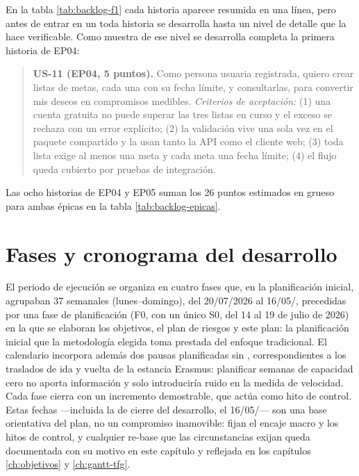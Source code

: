 En la tabla \ref{tab:backlog-f1} cada historia aparece resumida en una línea, pero antes de entrar en un  toda historia se desarrolla hasta un nivel de detalle que la hace verificable.
Como muestra de ese nivel se desarrolla completa la primera historia de EP04:

\begin{quote}
  \textbf{US-11 (EP04, 5 puntos).}
  Como persona usuaria registrada, quiero crear listas de metas, cada una con su fecha límite, y consultarlas, para convertir mis deseos en compromisos medibles.
  \emph{Criterios de aceptación:} (1) una cuenta gratuita no puede superar las tres listas en curso y el exceso se rechaza con un error explícito; (2) la validación vive una sola vez en el paquete compartido y la usan tanto la \ac{API} como el cliente web; (3) toda lista exige al menos una meta y cada meta una fecha límite; (4) el flujo queda cubierto por pruebas de integración.
\end{quote}

Las ocho historias de EP04 y EP05 suman los 26 puntos estimados en grueso para ambas épicas en la tabla \ref{tab:backlog-epicas}.

\section{Fases y cronograma del desarrollo}
\label{sec:fases}

El periodo de ejecución se organiza en cuatro fases que, en la planificación inicial, agrupaban 37  semanales (lunes--domingo), del 20/07/2026 al 16/05/\thesisYear, precedidas por una fase de planificación (F0, con un único  S0, del 14 al 19 de julio de 2026) en la que se elaboran los objetivos, el plan de riesgos y este plan: la planificación inicial que la metodología elegida toma prestada del enfoque tradicional.
El calendario incorpora además dos pausas planificadas sin , correspondientes a los traslados de ida y vuelta de la estancia Erasmus: planificar semanas de capacidad cero no aporta información y solo introduciría ruido en la medida de velocidad.
Cada fase cierra con un incremento demostrable, que actúa como hito de control.
Estas fechas —incluida la de cierre del desarrollo, el 16/05/\thesisYear— son una base orientativa del plan, no un compromiso inamovible: fijan el encaje macro y los hitos de control, y cualquier re-base que las circunstancias exijan queda documentada con su motivo en este capítulo y reflejada en los capítulos \ref{ch:objetivos} y \ref{ch:gantt-tfg}.


